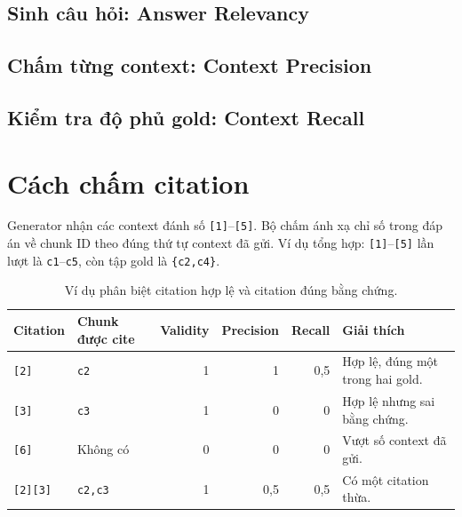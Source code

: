 \subsection*{Sinh câu hỏi: Answer Relevancy}


\subsection*{Chấm từng context: Context Precision}


\subsection*{Kiểm tra độ phủ gold: Context Recall}


\section{Cách chấm citation}

Generator nhận các context đánh số \texttt{[1]}--\texttt{[5]}. Bộ chấm ánh xạ
chỉ số trong đáp án về chunk ID theo đúng thứ tự context đã gửi. Ví dụ tổng
hợp: \texttt{[1]}--\texttt{[5]} lần lượt là \texttt{c1}--\texttt{c5}, còn tập
gold là \texttt{\{c2,c4\}}.

\begin{table}[H]
  \centering
  \caption{Ví dụ phân biệt citation hợp lệ và citation đúng bằng chứng.}
  \label{tab:appendix-citation-examples}
  \small
  \begin{tabularx}{\textwidth}{@{}p{24mm}p{28mm}rrrX@{}}
    \toprule
    \textbf{Citation} & \textbf{Chunk được cite} & \textbf{Validity} &
    \textbf{Precision} & \textbf{Recall} & \textbf{Giải thích} \\
    \midrule
    \texttt{[2]} & \texttt{c2} & 1 & 1 & 0,5 & Hợp lệ, đúng một trong hai gold. \\
    \texttt{[3]} & \texttt{c3} & 1 & 0 & 0 & Hợp lệ nhưng sai bằng chứng. \\
    \texttt{[6]} & Không có & 0 & 0 & 0 & Vượt số context đã gửi. \\
    \texttt{[2][3]} & \texttt{c2,c3} & 1 & 0,5 & 0,5 & Có một citation thừa. \\
    \bottomrule
  \end{tabularx}
\end{table}

